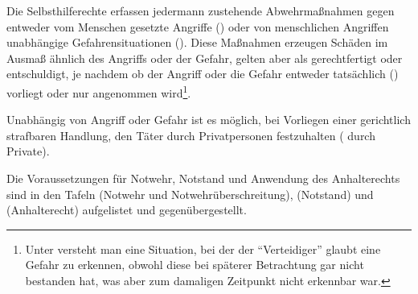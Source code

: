 Die Selbsthilferechte erfassen jedermann zustehende
Abwehrmaßnahmen gegen entweder vom Menschen gesetzte
Angriffe () oder
von menschlichen Angriffen unabhängige Gefahrensituationen
(). Diese Maßnahmen erzeugen 
Schäden im Ausmaß ähnlich des Angriffs oder der Gefahr,
gelten aber als gerechtfertigt oder
entschuldigt, je nachdem ob der Angriff oder
die Gefahr entweder tatsächlich
() vorliegt oder nur 
angenommen wird\footnote{Unter 
versteht man eine Situation, bei der der \enquote{Verteidiger}
glaubt eine Gefahr zu erkennen, obwohl diese bei späterer
Betrachtung gar nicht bestanden hat, was aber zum
damaligen Zeitpunkt nicht erkennbar war.}. 


Unabhängig von Angriff oder Gefahr ist es möglich, bei
Vorliegen einer gerichtlich strafbaren Handlung, den Täter
durch Privatpersonen festzuhalten ( durch
Private).

Die Voraussetzungen für Notwehr, Notstand und Anwendung des
Anhalterechts sind in den Tafeln
 (Notwehr und
Notwehrüberschreitung),  (Notstand)
und  (Anhalterecht)
aufgelistet und gegenübergestellt. 



